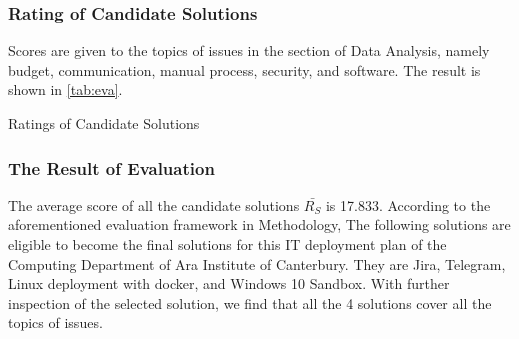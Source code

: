 \subsubsection{Rating of Candidate Solutions}

Scores are given to the topics of issues in the section of Data Analysis, namely budget, communication, manual process, security, and software. The result is shown in \autoref{tab:eva}.

\begin{table}[!ht]
\caption{Ratings of Candidate Solutions}
\begin{adjustbox}{width=1\textwidth}
\end{adjustbox}
\label{tab:eva}
\end{table}

\subsubsection{The Result of Evaluation}
The average score of all the candidate solutions $\bar{R_{S}}$ is 17.833. According to the aforementioned evaluation framework in Methodology, The following solutions are eligible to become the final solutions for this IT deployment plan of the Computing Department of Ara Institute of Canterbury. They are Jira, Telegram, Linux deployment with docker, and Windows 10 Sandbox. With further inspection of the selected solution, we find that all the 4 solutions cover all the topics of issues.





